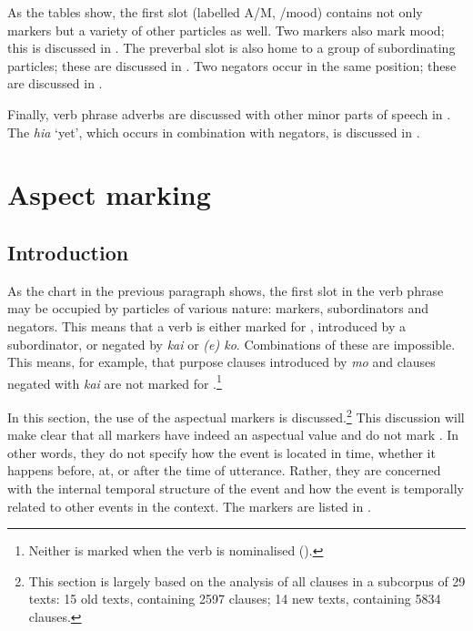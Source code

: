 As the tables show, the first slot (labelled A/M, /mood) contains not only  markers but a variety of other particles as well. Two  markers also mark  mood; this is discussed in . The preverbal slot is also home to a group of subordinating particles; these are discussed in . Two negators occur in the same position; these are discussed in . 

Finally, verb phrase adverbs are discussed with other minor parts of speech in . The  \textit{hia} ‘yet’, which occurs in combination with negators, is discussed in .

\section{Aspect marking}\label{sec:7.2}
\subsection{Introduction}\label{sec:7.2.1}

As the chart in the previous paragraph shows, the first slot in the verb phrase may be occupied by particles of various nature:  markers, subordinators and negators. This means that a verb is either marked for , introduced by a subordinator, or negated by \textit{kai} or \textit{(e) ko}. Combinations of these are impossible. This means, for example, that purpose clauses introduced by \textit{mo} and clauses negated with \textit{kai} are not marked for .\footnote{\label{fn:309}Neither is  marked when the verb is nominalised ().} 

In this section, the use of the aspectual markers is discussed.\footnote{\label{fn:310}This section is largely based on the analysis of all clauses in a subcorpus of 29 texts: 15 old texts, containing 2597 clauses; 14 new texts, containing 5834 clauses.}  This discussion will make clear that all markers have indeed an aspectual value and do not mark . In other words, they do not specify how the event is located in time, whether it happens before, at, or after the time of utterance. Rather, they are concerned with the internal temporal structure of the event and how the event is temporally related to other events in the context. The  markers are listed in .

